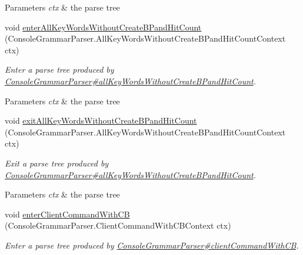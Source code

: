 \begin{DoxyCompactItemize}
\begin{DoxyCompactList}
\begin{DoxyParams}{Parameters}
{\em ctx} & the parse tree\\
\hline
\end{DoxyParams}
 \end{DoxyCompactList}\item 
void \hyperlink{classgov_1_1nasa_1_1jpf_1_1inspector_1_1client_1_1parser_1_1_console_grammar_base_listener_a85e20c406040b20a7ee1ff3a2f04420a}{enter\+All\+Key\+Words\+Without\+Create\+B\+Pand\+Hit\+Count} (Console\+Grammar\+Parser.\+All\+Key\+Words\+Without\+Create\+B\+Pand\+Hit\+Count\+Context ctx)
\begin{DoxyCompactList}\small\item\em Enter a parse tree produced by \hyperlink{classgov_1_1nasa_1_1jpf_1_1inspector_1_1client_1_1parser_1_1_console_grammar_parser_aff31036dcee67dbba83def31e4761e4e}{Console\+Grammar\+Parser\#all\+Key\+Words\+Without\+Create\+B\+Pand\+Hit\+Count}.


\begin{DoxyParams}{Parameters}
{\em ctx} & the parse tree\\
\hline
\end{DoxyParams}
 \end{DoxyCompactList}\item 
void \hyperlink{classgov_1_1nasa_1_1jpf_1_1inspector_1_1client_1_1parser_1_1_console_grammar_base_listener_af63af6c153578da4dc75ac26eaa3ca35}{exit\+All\+Key\+Words\+Without\+Create\+B\+Pand\+Hit\+Count} (Console\+Grammar\+Parser.\+All\+Key\+Words\+Without\+Create\+B\+Pand\+Hit\+Count\+Context ctx)
\begin{DoxyCompactList}\small\item\em Exit a parse tree produced by \hyperlink{classgov_1_1nasa_1_1jpf_1_1inspector_1_1client_1_1parser_1_1_console_grammar_parser_aff31036dcee67dbba83def31e4761e4e}{Console\+Grammar\+Parser\#all\+Key\+Words\+Without\+Create\+B\+Pand\+Hit\+Count}.


\begin{DoxyParams}{Parameters}
{\em ctx} & the parse tree\\
\hline
\end{DoxyParams}
 \end{DoxyCompactList}\item 
void \hyperlink{classgov_1_1nasa_1_1jpf_1_1inspector_1_1client_1_1parser_1_1_console_grammar_base_listener_a520c5c688d6a8d9fe2e05e559749595b}{enter\+Client\+Command\+With\+CB} (Console\+Grammar\+Parser.\+Client\+Command\+With\+C\+B\+Context ctx)
\begin{DoxyCompactList}\small\item\em Enter a parse tree produced by \hyperlink{classgov_1_1nasa_1_1jpf_1_1inspector_1_1client_1_1parser_1_1_console_grammar_parser_af370380e1a8bd00a938ccef2cf6a7b1b}{Console\+Grammar\+Parser\#client\+Command\+With\+CB}.



\end{DoxyCompactList}
\end{DoxyCompactItemize}
